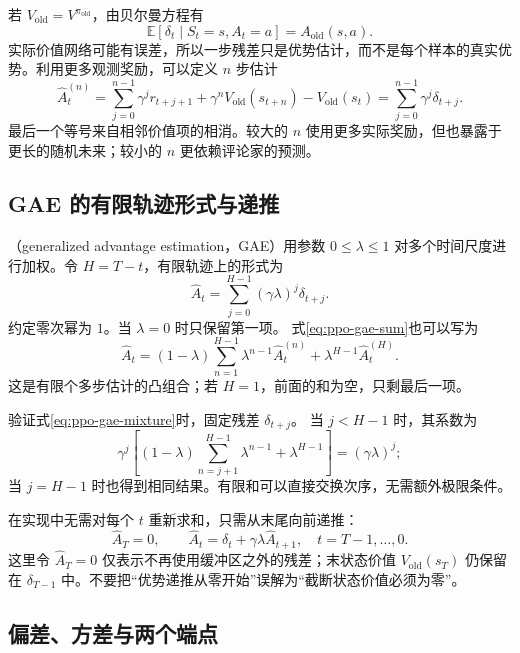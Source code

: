 \documentclass[UTF8]{ctexart}
\begin{document}
若 $V_{\mathrm{old}}=V^{\pi_{\mathrm{old}}}$，由贝尔曼方程有
\[
  \mathbb E[\delta_t\mid S_t=s,A_t=a]
  =A_{\mathrm{old}}(s,a).
\]
实际价值网络可能有误差，所以一步残差只是优势估计，而不是每个样本的真实优势。利用更多观测奖励，可以定义 $n$ 步估计
\begin{equation}
  \widehat A_t^{(n)}
  =\sum_{j=0}^{n-1}\gamma^j r_{t+j+1}
   +\gamma^nV_{\mathrm{old}}(s_{t+n})
   -V_{\mathrm{old}}(s_t)
  =\sum_{j=0}^{n-1}\gamma^j\delta_{t+j}.
  \label{eq:ppo-nstep-advantage}
\end{equation}
最后一个等号来自相邻价值项的相消。较大的 $n$ 使用更多实际奖励，但也暴露于更长的随机未来；较小的 $n$ 更依赖评论家的预测。

\subsection{GAE 的有限轨迹形式与递推}

（generalized advantage estimation，GAE）用参数 $0\le\lambda\le1$ 对多个时间尺度进行加权\cite{schulman-gae}。令 $H=T-t$，有限轨迹上的形式为
\begin{equation}
  \widehat A_t
  =\sum_{j=0}^{H-1}(\gamma\lambda)^j\delta_{t+j}.
  \label{eq:ppo-gae-sum}
\end{equation}
约定零次幂为 $1$。当 $\lambda=0$ 时只保留第一项。
式\eqref{eq:ppo-gae-sum}也可以写为
\begin{equation}
  \widehat A_t
  =(1-\lambda)\sum_{n=1}^{H-1}\lambda^{n-1}\widehat A_t^{(n)}
   +\lambda^{H-1}\widehat A_t^{(H)}.
  \label{eq:ppo-gae-mixture}
\end{equation}
这是有限个多步估计的凸组合；若 $H=1$，前面的和为空，只剩最后一项。

验证式\eqref{eq:ppo-gae-mixture}时，固定残差 $\delta_{t+j}$。
当 $j<H-1$ 时，其系数为
\[
  \gamma^j\left[
    (1-\lambda)\sum_{n=j+1}^{H-1}\lambda^{n-1}
    +\lambda^{H-1}\right]
  =(\gamma\lambda)^j;
\]
当 $j=H-1$ 时也得到相同结果。有限和可以直接交换次序，无需额外极限条件。

在实现中无需对每个 $t$ 重新求和，只需从末尾向前递推：
\begin{equation}
  \widehat A_T=0,\qquad
  \widehat A_t=\delta_t+\gamma\lambda\widehat A_{t+1},
  \quad t=T-1,\ldots,0.
  \label{eq:ppo-gae-recursion}
\end{equation}
这里令 $\widehat A_T=0$ 仅表示不再使用缓冲区之外的残差；末状态价值
$V_{\mathrm{old}}(s_T)$ 仍保留在 $\delta_{T-1}$ 中。不要把“优势递推从零开始”误解为“截断状态价值必须为零”。

\subsection{偏差、方差与两个端点}
\end{document}
